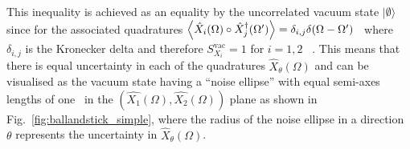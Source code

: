 This inequality is achieved as an equality by the uncorrelated vacuum state $\lvert\emptyset\rangle$ since for the associated quadratures $\ev{\hat{X}_i(\Omega)\circ\hat{X}_j^\dag(\Omega')}=\delta_{i,j}\delta(\Omega-\Omega')$~\cite{} where $\delta_{i,j}$ is the Kronecker delta and therefore $S_{X_i}^\text{vac}=1$ for $i=1,2$~\cite{danilishinQuantumMeasurementTheory2012} . This means that there is equal uncertainty in each of the quadratures $\hat{X}_\theta(\Omega)$ and can be visualised as the vacuum state having a ``noise ellipse'' with equal semi-axes lengths of one~\cite{} in the $(\hat{X_1}(\Omega),\hat{X_2}(\Omega))$ plane as shown in Fig.~\ref{fig:ballandstick_simple}, where the radius of the noise ellipse in a direction $\theta$ represents the uncertainty in $\hat{X}_\theta(\Omega)$.




